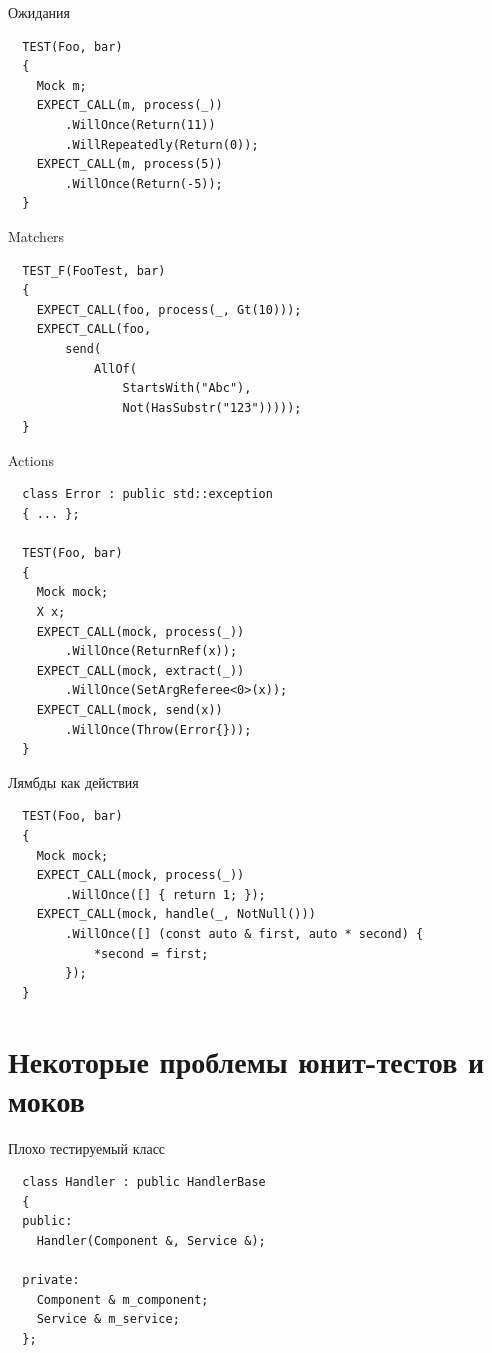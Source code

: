 \documentclass[unknownkeysallowed,xcolor=table]{beamer}
\begin{document}
\begin{frame}[fragile]{Ожидания}
  \begin{lstlisting}
  TEST(Foo, bar)
  {
    Mock m;
    EXPECT_CALL(m, process(_))
        .WillOnce(Return(11))
        .WillRepeatedly(Return(0));
    EXPECT_CALL(m, process(5))
        .WillOnce(Return(-5));
  }
  \end{lstlisting}
\end{frame}

\begin{frame}[fragile]{Matchers}
  \begin{lstlisting}
  TEST_F(FooTest, bar)
  {
    EXPECT_CALL(foo, process(_, Gt(10)));
    EXPECT_CALL(foo,
        send(
            AllOf(
                StartsWith("Abc"),
                Not(HasSubstr("123")))));
  }
  \end{lstlisting}
\end{frame}

\begin{frame}[fragile]{Actions}
  \begin{lstlisting}
  class Error : public std::exception
  { ... };

  TEST(Foo, bar)
  {
    Mock mock;
    X x;
    EXPECT_CALL(mock, process(_))
        .WillOnce(ReturnRef(x));
    EXPECT_CALL(mock, extract(_))
        .WillOnce(SetArgReferee<0>(x));
    EXPECT_CALL(mock, send(x))
        .WillOnce(Throw(Error{}));
  }
  \end{lstlisting}
\end{frame}

\begin{frame}[fragile]{Лямбды как действия}
  \begin{lstlisting}
  TEST(Foo, bar)
  {
    Mock mock;
    EXPECT_CALL(mock, process(_))
        .WillOnce([] { return 1; });
    EXPECT_CALL(mock, handle(_, NotNull()))
        .WillOnce([] (const auto & first, auto * second) {
            *second = first;
        });
  }
  \end{lstlisting}
\end{frame}

\section{Некоторые проблемы юнит-тестов и моков}

\begin{frame}[fragile]{Плохо тестируемый класс}
  \begin{lstlisting}
  class Handler : public HandlerBase
  {
  public:
    Handler(Component &, Service &);

  private:
    Component & m_component;
    Service & m_service;
  };
  \end{lstlisting}
\end{frame}
\end{document}

